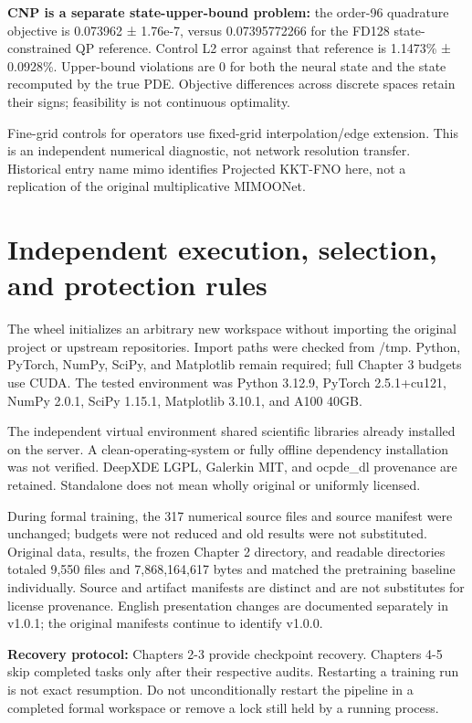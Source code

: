 \documentclass[a4paper,10pt]{article}
\begin{document}
\textbf{CNP is a separate state-upper-bound problem:} the order-96 quadrature objective is 0.073962 ± 1.76e-7, versus 0.07395772266 for the FD128 state-constrained QP reference. Control L2 error against that reference is 1.1473\% ± 0.0928\%. Upper-bound violations are 0 for both the neural state and the state recomputed by the true PDE. Objective differences across discrete spaces retain their signs; feasibility is not continuous optimality.

Fine-grid controls for operators use fixed-grid interpolation/edge extension. This is an independent numerical diagnostic, not network resolution transfer. Historical entry name mimo identifies Projected KKT-FNO here, not a replication of the original multiplicative MIMOONet.

\section{Independent execution, selection, and protection rules}

The wheel initializes an arbitrary new workspace without importing the original project or upstream repositories. Import paths were checked from /tmp. Python, PyTorch, NumPy, SciPy, and Matplotlib remain required; full Chapter 3 budgets use CUDA. The tested environment was Python 3.12.9, PyTorch 2.5.1+cu121, NumPy 2.0.1, SciPy 1.15.1, Matplotlib 3.10.1, and A100 40GB.

The independent virtual environment shared scientific libraries already installed on the server. A clean-operating-system or fully offline dependency installation was not verified. DeepXDE LGPL, Galerkin MIT, and ocpde\_dl provenance are retained. Standalone does not mean wholly original or uniformly licensed.

During formal training, the 317 numerical source files and source manifest were unchanged; budgets were not reduced and old results were not substituted. Original data, results, the frozen Chapter 2 directory, and readable directories totaled 9,550 files and 7,868,164,617 bytes and matched the pretraining baseline individually. Source and artifact manifests are distinct and are not substitutes for license provenance. English presentation changes are documented separately in v1.0.1; the original manifests continue to identify v1.0.0.

\textbf{Recovery protocol:} Chapters 2-3 provide checkpoint recovery. Chapters 4-5 skip completed tasks only after their respective audits. Restarting a training run is not exact resumption. Do not unconditionally restart the pipeline in a completed formal workspace or remove a lock still held by a running process.
\end{document}
